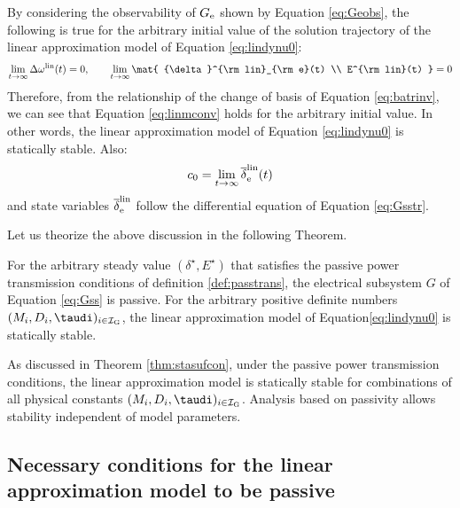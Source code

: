 \documentclass[tombow,dvipdfmx]{corona-a5-1.1}
\begin{document}
By considering the observability of $G_{\rm e}$ shown by Equation \ref{eq:Geobs},
the following is true for the arbitrary initial value of the solution trajectory of the linear approximation model of Equation \ref{eq:lindynu0}:
\begin{align}\label{eq:allzero}
\lim_{t\rightarrow \infty} \Delta \omega^{\rm lin}(t)  =0,\qquad
\lim_{t\rightarrow \infty} \mat{
{\delta}^{\rm lin}_{\rm e}(t)   \\
E^{\rm lin}(t)  
}
 =0
\end{align}
Therefore, from the relationship of the change of basis of Equation \ref{eq:batrinv}, we can see that Equation \ref{eq:linmconv} holds for the arbitrary initial value.
In other words, the linear approximation model of Equation \ref{eq:lindynu0} is statically stable.
Also:
\[
c_0 = \lim_{t\rightarrow \infty}\overline{\delta}^{\rm lin}_{\rm e}(t)
\]
and state variables $\overline{\delta}^{\rm lin}_{\rm e}$ follow the differential equation of Equation \ref{eq:Gsstr}.

Let us theorize the above discussion in the following Theorem.

\begin{定理}\label{thm:stasufcon}
For the arbitrary steady value $(\delta^{\star},E^{\star})$ that satisfies the passive power transmission conditions of definition \ref{def:passtrans}, the electrical subsystem $G$ of Equation \ref{eq:Gss} is passive.
For the arbitrary positive definite numbers $(M_i,D_i,\taudi )_{i \in \mathcal{I}_{\rm G}}$, the linear approximation model of Equation\ref{eq:lindynu0} is statically stable.
\end{定理}

As discussed in Theorem \ref{thm:stasufcon}, under the passive power transmission conditions, the linear approximation model is statically stable for combinations of all physical constants $(M_i,D_i,\taudi )_{i \in \mathcal{I}_{\rm G}}$.
Analysis based on passivity allows stability independent of model parameters.



\subsection{Necessary conditions for the linear approximation model to be passive\advanced}\label{sec:nesconana}
\end{document}
